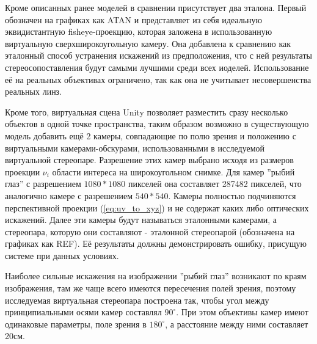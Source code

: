 Кроме описанных ранее моделей в сравнении  присутствует два эталона. Первый обозначен на графиках как ATAN и представляет из себя идеальную 
эквидистантную fisheye-проекцию, которая заложена в использованную виртуальную сверхширокоугольную камеру. Она добавлена к сравнению как 
эталонный способ устранения искажений из предположения, что с ней результаты стереосопоставления будут самыми лучшими среди всех иоделей. 
Использование её на реальных объективах ограничено, так как она не учитывает несовершенства реальных линз. 

Кроме того, виртуальная сцена Unity позволяет разместить сразу несколько объектов в одной точке пространства, таким образом возможно
в существующую модель добавить ещё 2 камеры, совпадающие по полю зрения и положению с виртуальными камерами-обскурами, использованными 
в исследуемой виртуальной стереопаре. Разрешение этих камер выбрано исходя из размеров проекции $\nu_i$ области интереса на широкоугольном
снимке. Для камер ''рыбий глаз'' с разрешением $1080*1080$ пикселей она составляет 287482 пикселей, что аналогично камере 
с разрешением $540*540$. Камеры полностью подчиняются перспективной проекции (\ref{eq:uv_to_xyz}) и не содержат каких либо оптических искажений.
 Далее эти камеры будут называться эталонными камерами, а стереопара, которую они составляют - эталонной стереопарой (обозначена на графиках как REF).
Её результаты должны демонстрировать ошибку, присущую системе при данных условиях. %

Наиболее сильные искажения на изображении ''рыбий глаз'' возникают по краям изображения, там же чаще всего имеются пересечения полей зрения,
 поэтому исследуемая виртуальная стереопара построена так, чтобы угол между принципиальными осями камер составлял $90^\circ$. При этом объективы 
 камер имеют одинаковые параметры, поле зрения в $180^\circ$, а расстояние между ними составляет 20см. %

